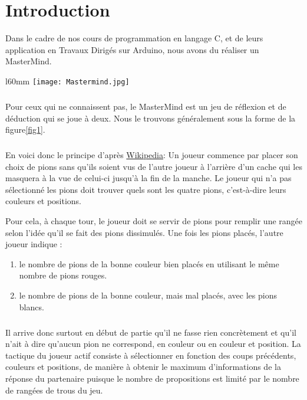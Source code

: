 \chapter*{Introduction}
    
	Dans le cadre de nos cours de programmation en langage C, et de leurs application en Travaux Dirigés sur Arduino\footnotemark, nous avons du réaliser un MasterMind.

\begin{wrapfigure}{l}{60mm}
	\centering
    \texttt{[image: Mastermind.jpg]}
    \label{fig1}
\end{wrapfigure}
   	
    \paragraph{}
    Pour ceux qui ne connaissent pas, le MasterMind est un jeu de réflexion et de déduction qui se joue à deux. 
    Nous le trouvons généralement sous la forme de la figure\ref{fig1}.
\paragraph{}
    En voici donc le principe d'après \href{https://fr.wikipedia.org/wiki/Mastermind}{Wikipedia}:
	Un joueur commence par placer son choix de pions sans qu'ils soient vus de l'autre joueur à l'arrière d'un cache qui les masquera à la vue de celui-ci jusqu'à la fin de la manche.
	Le joueur qui n'a pas sélectionné les pions doit trouver quels sont les quatre pions, c'est-à-dire leurs couleurs et positions.

	Pour cela, à chaque tour, le joueur doit se servir de pions pour remplir une rangée selon l'idée qu'il se fait des pions dissimulés.
	Une fois les pions placés, l'autre joueur indique :
	\begin{enumerate}
		\item le nombre de pions de la bonne couleur bien placés en utilisant le même nombre de pions rouges.
		\item le nombre de pions de la bonne couleur, mais mal placés, avec les pions blancs.
	\end{enumerate}


\paragraph{}
	Il arrive donc surtout en début de partie qu'il ne fasse rien concrètement et qu'il n'ait à dire qu'aucun pion ne correspond, en couleur ou en couleur et position.
	La tactique du joueur actif consiste à sélectionner en fonction des coups précédents, couleurs et positions, de manière à obtenir le maximum d'informations de la réponse du partenaire puisque le nombre de propositions est limité par le nombre de rangées de trous du jeu. 
    
